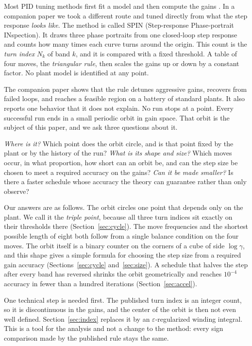\documentclass[letterpaper, 10pt, conference, twocolumn]{ieeeconf}
\begin{document}
Most PID tuning methods first fit a model and then compute the gains
\cite{ZN1942,AstromHagglund2004}. In a companion paper \cite{Paper1} we took a
different route and tuned directly from what the step response \emph{looks
like}. The method is called SPIN (Step-response Phase-portrait INspection). It
draws three phase portraits from one closed-loop step response and counts how
many times each curve turns around the origin. This count is the \emph{turn
index} $N_k$ of band $k$, and it is compared with a fixed threshold. A table of
four moves, the \emph{triangular rule}, then scales the gains up or down by a
constant factor. No plant model is identified at any point.

The companion paper shows that the rule detunes aggressive gains, recovers
from failed loops, and reaches a feasible region on a battery of standard
plants. It also reports one behavior that it does not explain. No run stops at
a point. Every successful run ends in a small periodic orbit in gain space.
That orbit is the subject of this paper, and we ask three questions about it.

\emph{Where is it?} Which point does the orbit circle, and is that point
fixed by the plant or by the history of the run? \emph{What is its shape and
size?} Which moves occur, in what proportion, how short can an orbit be, and
can the step size be chosen to meet a required accuracy on the gains?
\emph{Can it be made smaller?} Is there a faster schedule whose accuracy the
theory can guarantee rather than only observe?

Our answers are as follows. The orbit circles one point that depends only on
the plant. We call it the \emph{triple point}, because all three turn indices
sit exactly on their thresholds there (Section~\ref{sec:cycle}). The move
frequencies and the shortest possible length of eight both follow from a single
balance condition on the four moves. The orbit itself is a binary counter on
the corners of a cube of side $\log\gamma$, and this shape gives a simple
formula for choosing the step size from a required gain accuracy
(Sections~\ref{sec:cycle} and~\ref{sec:size}). A schedule that halves the step
after every band has reversed shrinks the orbit geometrically and reaches
$10^{-4}$ accuracy in fewer than a hundred iterations
(Section~\ref{sec:accel}).

One technical step is needed first. The published turn index is an integer
count, so it is discontinuous in the gains, and the center of the orbit is then
not even well defined. Section~\ref{sec:index} replaces it by an
$\varepsilon$-regularized winding integral. This is a tool for the analysis and
not a change to the method: every sign comparison made by the published rule
stays the same.
\end{document}
